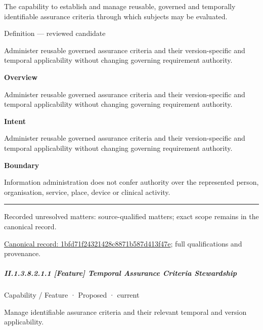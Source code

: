 The capability to establish and manage reusable, governed and temporally identifiable assurance criteria through which subjects may be evaluated.



Definition — reviewed candidate



Administer reusable governed assurance criteria and their version-specific and temporal applicability without changing governing requirement authority.



\textbf{Overview}



Administer reusable governed assurance criteria and their version-specific and temporal applicability without changing governing requirement authority.



\textbf{Intent}



Administer reusable governed assurance criteria and their version-specific and temporal applicability without changing governing requirement authority.



\textbf{Boundary}



Information administration does not confer authority over the represented person, organisation, service, place, device or clinical activity.



\medskip\hrule\medskip

{\small Recorded unresolved matters: source-qualified matters; exact scope remains in the canonical record.}\par
{\footnotesize \href{../../../../../../../continuum/strategy/capability/1bfd71f24321428c8871b587d413f47e.md}{Canonical record: 1bfd71f24321428c8871b587d413f47e}; full qualifications and provenance.}\par
\subparagraph*{II.1.3.8.2.1.1 [Feature] Temporal Assurance Criteria Stewardship}
\label{navigation:II.1.3.8.2.1.1}

\label{element:e345a4b1eef846a7b77568f519e2c75c}
{\small Capability / Feature · Proposed · current}\par

Manage identifiable assurance criteria and their relevant temporal and version applicability.



